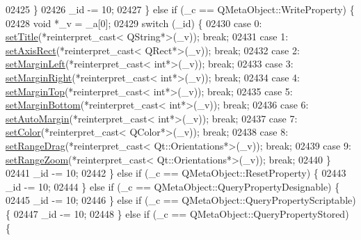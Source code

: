 \begin{DoxyCode}
02425         \}
02426         \_id -= 10;
02427     \} \textcolor{keywordflow}{else} \textcolor{keywordflow}{if} (\_c == QMetaObject::WriteProperty) \{
02428         \textcolor{keywordtype}{void} *\_v = \_a[0];
02429         \textcolor{keywordflow}{switch} (\_id) \{
02430         \textcolor{keywordflow}{case} 0: \hyperlink{a00116_a84257c1e1f984b3932245069428f3176}{setTitle}(*reinterpret\_cast< QString*>(\_v)); \textcolor{keywordflow}{break};
02431         \textcolor{keywordflow}{case} 1: \hyperlink{a00116_a5de3a26b172b17e1f0e35bfc596d9d4d}{setAxisRect}(*reinterpret\_cast< QRect*>(\_v)); \textcolor{keywordflow}{break};
02432         \textcolor{keywordflow}{case} 2: \hyperlink{a00116_a3be3a999be642fc336d4f4bf8299b27a}{setMarginLeft}(*reinterpret\_cast< int*>(\_v)); \textcolor{keywordflow}{break};
02433         \textcolor{keywordflow}{case} 3: \hyperlink{a00116_a1822d02903f715e6910c0b55dd1506b9}{setMarginRight}(*reinterpret\_cast< int*>(\_v)); \textcolor{keywordflow}{break};
02434         \textcolor{keywordflow}{case} 4: \hyperlink{a00116_a3078bfcda0a3eda7782d8ca01f71ad7e}{setMarginTop}(*reinterpret\_cast< int*>(\_v)); \textcolor{keywordflow}{break};
02435         \textcolor{keywordflow}{case} 5: \hyperlink{a00116_a87d42c0b0a224f9f9e43013fff4199d9}{setMarginBottom}(*reinterpret\_cast< int*>(\_v)); \textcolor{keywordflow}{break};
02436         \textcolor{keywordflow}{case} 6: \hyperlink{a00116_aed5bb30c9b04c1d0103ab8ef7190f23a}{setAutoMargin}(*reinterpret\_cast< int*>(\_v)); \textcolor{keywordflow}{break};
02437         \textcolor{keywordflow}{case} 7: \hyperlink{a00116_a858bbcf98637471449e438304a00624b}{setColor}(*reinterpret\_cast< QColor*>(\_v)); \textcolor{keywordflow}{break};
02438         \textcolor{keywordflow}{case} 8: \hyperlink{a00116_aa0e1c44295da2706d0f12ad48f64b806}{setRangeDrag}(*reinterpret\_cast< Qt::Orientations*>(\_v)); \textcolor{keywordflow}{break};
02439         \textcolor{keywordflow}{case} 9: \hyperlink{a00116_ad4a0919e471549a2daea517ce6538ad8}{setRangeZoom}(*reinterpret\_cast< Qt::Orientations*>(\_v)); \textcolor{keywordflow}{break};
02440         \}
02441         \_id -= 10;
02442     \} \textcolor{keywordflow}{else} \textcolor{keywordflow}{if} (\_c == QMetaObject::ResetProperty) \{
02443         \_id -= 10;
02444     \} \textcolor{keywordflow}{else} \textcolor{keywordflow}{if} (\_c == QMetaObject::QueryPropertyDesignable) \{
02445         \_id -= 10;
02446     \} \textcolor{keywordflow}{else} \textcolor{keywordflow}{if} (\_c == QMetaObject::QueryPropertyScriptable) \{
02447         \_id -= 10;
02448     \} \textcolor{keywordflow}{else} \textcolor{keywordflow}{if} (\_c == QMetaObject::QueryPropertyStored) \{

\end{DoxyCode}
